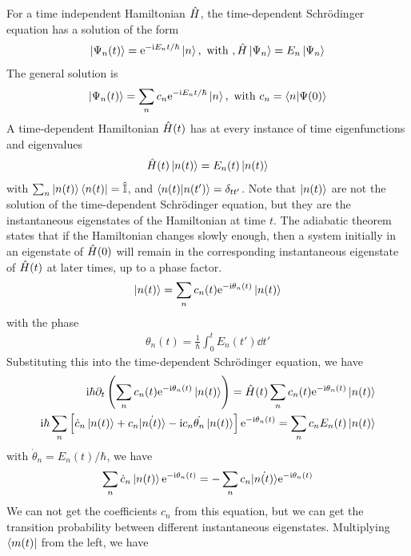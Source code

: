 For a time independent Hamiltonian $\hat{H}$, the time-dependent Schrödinger equation has a solution of the form
\begin{align}
    \ket{\Psi_n(t)} = \mathrm{e}^{-\mathrm{i} E_n t/\hbar} \ket{n}, \text{ with }, \hat{H} \ket{\Psi_n} = E_n \ket{\Psi_n}
\end{align}
The general solution is 
\begin{align}
    \ket{\Psi_n(t)} = \sum_n c_n \mathrm{e}^{-\mathrm{i} E_n t/\hbar} \ket{n}, \text{ with } c_n = \braket{n|\Psi(0)}
\end{align}
A time-dependent Hamiltonian $\hat{H}(t)$ has at every instance of time eigenfunctions and eigenvalues
\begin{align}
    \hat{H}(t) \ket{n(t)} = E_n(t) \ket{n(t)}
\end{align}
with $\sum_n \ket{n(t)}\bra{n(t)} = \hat{\mathbb{I}}$, and $\braket{n(t)|n(t')} = \delta_{t t'}$. Note that $\ket{n(t)}$ are not the solution of the time-dependent Schrödinger equation, but they are the instantaneous eigenstates of the Hamiltonian at time $t$. The adiabatic theorem states that if the Hamiltonian changes slowly enough, then a system initially in an eigenstate of $\hat{H}(0)$ will remain in the corresponding instantaneous eigenstate of $\hat{H}(t)$ at later times, up to a phase factor. 
\begin{align}
    \ket{n(t)} = \sum_n c_n(t) \mathrm{e}^{-\mathrm{i} \theta_n(t)} \ket{n(t)}
\end{align}
with the phase 
\begin{align}
    \theta_n(t) = \frac{1}{\hbar} \int_0^t E_n(t') \dd t'
\end{align}
Substituting this into the time-dependent Schrödinger equation, we have
\begin{align*}
    \mathrm{i} \hbar \partial_t \left( \sum_n c_n(t) \mathrm{e}^{-\mathrm{i} \theta_n(t)} \ket{n(t)} \right) = \hat{H}(t) \sum_n c_n(t) \mathrm{e}^{-\mathrm{i} \theta_n(t)} \ket{n(t)}\\
    \mathrm{i} \hbar \sum_n \left[ \dot c_n \ket{n(t)} + c_n \dot{\ket{n(t)}} - \mathrm{i} c_n \dot{\theta_n} \ket{n(t)} \right] \mathrm{e}^{- \mathrm{i} \theta_n(t)} =\sum_n c_n E_n(t) \ket{n(t)}
\end{align*}
with $\dot \theta_n = E_n(t)/\hbar$, we have 
\begin{align}
    \sum_n \dot c_n \ket{n(t)} \mathrm{e}^{-\mathrm{i} \theta_n(t)} = - \sum_n c_n \dot{\ket{n(t)}} \mathrm{e}^{-\mathrm{i} \theta_n(t)} 
\end{align}
We can not get the coefficients $c_n$ from this equation, but we can get the transition probability between different instantaneous eigenstates. Multiplying $\bra{m(t)}$ from the left, we have




